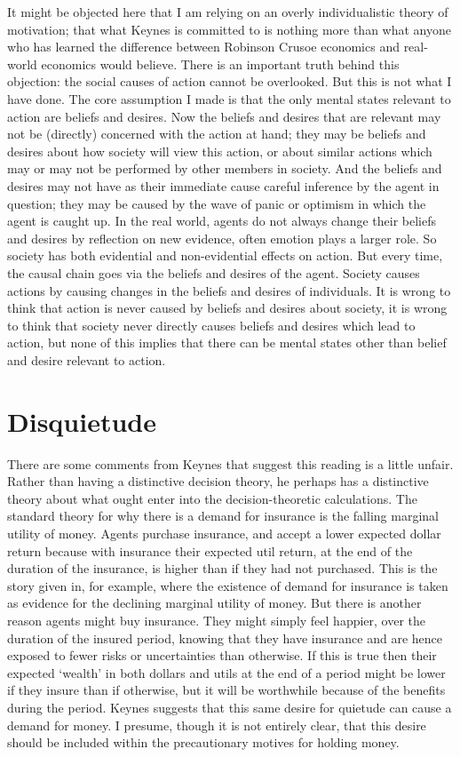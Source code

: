 It might be objected here that I am relying on an overly individualistic theory of motivation; that what Keynes is committed to is nothing more than what anyone who has learned the difference between Robinson Crusoe economics and real-world economics would believe. There is an important truth behind this objection: the social causes of action cannot be overlooked. But this is not what I have done. The core assumption I made is that the only mental states relevant to action are beliefs and desires. Now the beliefs and desires that are relevant may not be (directly) concerned with the action at hand; they may be beliefs and desires about how society will view this action, or about similar actions which may or may not be performed by other members in society. And the beliefs and desires may not have as their immediate cause careful inference by the agent in question; they may be caused by the wave of panic or optimism in which the agent is caught up. In the real world, agents do not always change their beliefs and desires by reflection on new evidence, often emotion plays a larger role. So society has both evidential and non-evidential effects on action. But every time, the causal chain goes via the beliefs and desires of the agent. Society causes actions by causing changes in the beliefs and desires of individuals. It is wrong to think that action is never caused by beliefs and desires about society, it is wrong to think that society never directly causes beliefs and desires which lead to action, but none of this implies that there can be mental states other than belief and desire relevant to action.

\section{Disquietude}
There are some comments from Keynes that suggest this reading is a little unfair. Rather than having a distinctive decision theory, he perhaps has a distinctive theory about what ought enter into the decision-theoretic calculations. The standard theory for why there is a demand for insurance is the falling marginal utility of money. Agents purchase insurance, and accept a lower expected dollar return because with insurance their expected util return, at the end of the duration of the insurance, is higher than if they had not purchased. This is the story given in, for example, \citet{FreidmanSavage1952} where the existence of demand for insurance is taken as evidence for the declining marginal utility of money. But there is another reason agents might buy insurance. They might simply feel happier, over the duration of the insured period, knowing that they have insurance and are hence exposed to fewer risks or uncertainties than otherwise. If this is true then their expected `wealth' in both dollars and utils at the end of a period might be lower if they insure than if otherwise, but it will be worthwhile because of the benefits during the period. Keynes suggests that this same desire for quietude can cause a demand for money. I presume, though it is not entirely clear, that this desire should be included within the precautionary motives for holding money.

